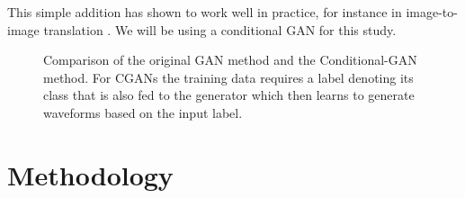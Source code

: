 \documentclass[12pt]{iopart}
\newcommand{\jordan}[1]{\textbf{\textcolor{red}{JORDAN: #1}}}
\newcommand{\chris}[1]{\textbf{\textcolor{green}{CHRIS: #1}}}
\begin{document}
This simple addition has shown to work well in practice, for instance in image-to-image translation \cite{isola2016imagetoimage}. We will be using a conditional GAN for this study.
%

%

\begin{figure}
    \centering
    \caption{Comparison of the original GAN method and the
Conditional-GAN method. For CGANs the training data requires a label denoting
its class that is also fed to the generator which then learns to generate
waveforms based on the input label.} \label{fig:gan_comparison}
\end{figure}

\section{Methodology}

\end{document}
